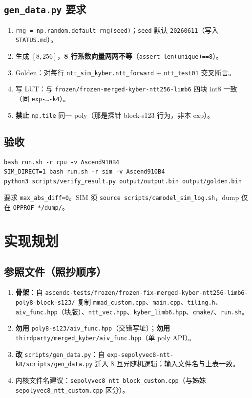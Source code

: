 \documentclass[UTF8,a4paper,11pt]{ctexart}
\begin{document}
\subsection{\texttt{gen\_data.py} 要求}
\begin{enumerate}
  \item \texttt{rng = np.random.default\_rng(seed)}；\texttt{seed} 默认 \texttt{20260611}（写入 \texttt{STATUS.md}）。
  \item 生成 $[8,256]$，\textbf{8 行系数向量两两不等}（\texttt{assert len(unique)==8}）。
  \item Golden：对每行 \texttt{ntt\_sim\_kyber.ntt\_forward} + \texttt{ntt\_test01} 交叉断言。
  \item 写 LUT：与 \texttt{frozen/frozen-merged-kyber-ntt256-limb6} 四块 int8 一致（同 \texttt{exp-…-k4}）。
  \item \textbf{禁止} \texttt{np.tile} 同一 poly（那是探针 block-s123 行为，非本 exp）。
\end{enumerate}

\subsection{验收}
\begin{verbatim}
bash run.sh -r cpu -v Ascend910B4
SIM_DIRECT=1 bash run.sh -r sim -v Ascend910B4
python3 scripts/verify_result.py output/output.bin output/golden.bin
\end{verbatim}
要求 \texttt{max\_abs\_diff=0}。SIM 须 \texttt{source scripts/camodel\_sim\_log.sh}，dump 仅在 \texttt{OPPROF\_*/dump/}。

\section{实现规划}

\subsection{参照文件（照抄顺序）}
\begin{enumerate}
  \item \textbf{骨架}：自 \texttt{ascendc-tests/frozen/frozen-fix-merged-kyber-ntt256-limb6-poly8-block-s123/} 复制
    \texttt{mmad\_custom.cpp}、\texttt{main.cpp}、\texttt{tiling.h}、\texttt{aiv\_func.hpp}（块版）、\texttt{ntt\_vec.hpp}、\texttt{kyber\_limb6.hpp}、\texttt{cmake/}、\texttt{run.sh}。
  \item \textbf{勿用} \texttt{poly8-s123/aiv\_func.hpp}（交错写址）；\textbf{勿用} \texttt{thirdparty/merged\_kyber/aiv\_func.hpp}（单 poly API）。
  \item \textbf{改} \texttt{scripts/gen\_data.py}：自 \texttt{exp-sepolyvec8-ntt-k8/scripts/gen\_data.py} 迁入 8 互异随机逻辑；输入文件名与上表一致。
  \item 内核文件名建议：\texttt{sepolyvec8\_ntt\_block\_custom.cpp}（与姊妹 \texttt{sepolyvec8\_ntt\_custom.cpp} 区分）。
\end{enumerate}
\end{document}
